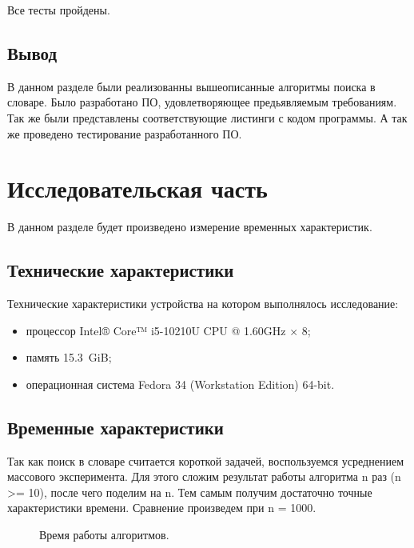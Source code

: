 \documentclass[12pt,a4paper]{report}
\begin{document}
Все тесты пройдены.


\section*{Вывод}

В данном разделе были реализованны вышеописанные алгоритмы поиска в словаре. Было разработано ПО, удовлетворяющее предьявляемым требованиям. Так же были представлены соответствующие листинги с кодом программы. А так же проведено тестирование разработанного ПО.

\newpage
\chapter{Исследовательская часть} 

В данном разделе будет произведено измерение временных характеристик.

\section{Технические характеристики}


Технические характеристики устройства на котором выполнялось исследование:
\begin{itemize}
	\item процессор Intel® Core™ i5-10210U CPU @ 1.60GHz × 8;
	\item память 15.3 GiB;
	\item операционная система Fedora 34 (Workstation Edition) 64-bit.
\end{itemize}




\section{Временные характеристики}

Так как поиск в словаре считается короткой задачей, воспользуемся усреднением массового эксперимента.
Для этого сложим результат работы алгоритма n раз (n >= 10), после чего поделим на n.
Тем самым получим достаточно точные характеристики времени.
Сравнение произведем при n = 1000.

\begin{figure}[ht!]
	\caption{Время работы алгоритмов.}
\end{figure}
\end{document}
